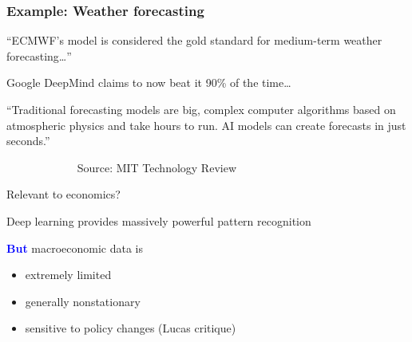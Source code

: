 \documentclass[
    xcolor={svgnames,dvipsnames},
    hyperref={colorlinks, citecolor=DeepPink4, linkcolor=DarkRed, urlcolor=DarkBlue}
    ]{beamer}  %
\newcommand{\navy}[1]{\textcolor{Blue}{\bf #1}}
\newcommand{\1}{\mathbbm 1}
\begin{document}
\begin{frame}
    \frametitle{Example: Weather forecasting}

    
    ``ECMWF's model is considered the gold standard for
        medium-term weather forecasting\ldots ''

        \pause

    \vspace{0.5em}
    Google DeepMind claims to now beat it 90\% of the time\ldots
    \vspace{0.5em}

    ``Traditional forecasting models are big, complex computer algorithms based
    on atmospheric physics and take hours to run. AI models can create forecasts
    in just seconds.'' 
    \vspace{0.5em}
    \vspace{0.5em}

    $\quad \qquad$$\quad \qquad$ Source: MIT Technology Review  

\end{frame}


\begin{frame}
    

    Relevant to economics?

    \vspace{0.5em}
    \pause
    Deep learning provides massively powerful pattern recognition

    \pause
    \vspace{0.5em}
    \vspace{0.5em}
    \vspace{0.5em}
    \navy{But} macroeconomic data is 

    \begin{itemize}
        \item extremely limited 
        \vspace{0.5em}
        \item generally nonstationary
        \vspace{0.5em}
        \item sensitive to policy changes (Lucas critique)
    \end{itemize}



\end{frame}
\end{document}
